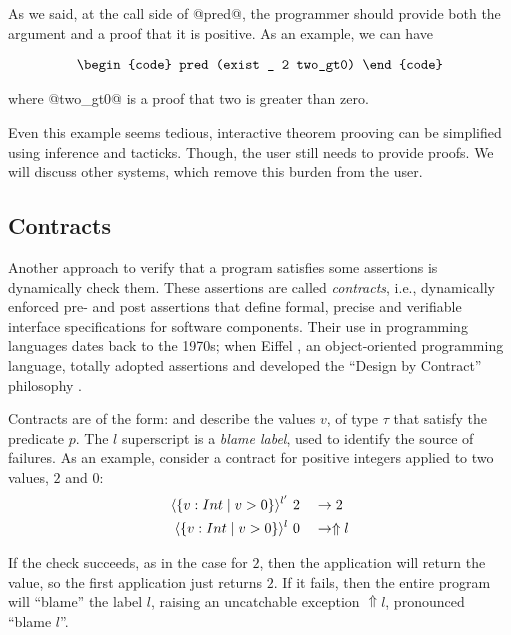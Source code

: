 As we said, at the call side of @pred@, the programmer should provide
both the argument and a proof that it is positive.
As an example, we can have 

$$\centering
\begin{tabular}{c}
\begin{code}
pred (exist _ 2 two_gt0)
\end{code}
\end{tabular}
$$
 
where @two_gt0@ is a proof that two is greater than zero.

\begin{comment}
Theorem two_gt0 : 2 > 0.
  crush.
Qed.
\end{comment}

Even this example seems tedious, 
interactive theorem prooving can be simplified
using inference and tacticks. 
%
Though, the user still needs to provide proofs.
%
We will discuss other systems, which remove this burden from the user.

\subsection{Contracts}


Another approach to verify that a program satisfies some 
assertions is dynamically check them.
% 
These assertions are called \textit{contracts}, i.e., 
dynamically enforced pre- and post assertions that
define formal, precise and verifiable interface specifications 
for software components.
%	
Their use in programming languages dates back to the 1970s; 
when Eiffel \cite{Eiffel}, an object-oriented programming language,
totally adopted assertions and developed the 
``Design by Contract'' philosophy \cite{Meyer92}.

Contracts are of the form:
and describe the values $v$, of type $\tau$
that satisfy the predicate $p$. 
The $l$ superscript is a \textit{blame label}, used to
identify the source of failures.
%
As an example, 
consider a contract for positive integers 
applied to two values, $2$ and $0$: 
\begin{align*}
\langle\{v : Int \mid v>0 \}\rangle^{l'}&\ 2 &&\rightarrow 2 \\
\langle\{v : Int \mid v>0 \}\rangle^{l}&\ 0  &&\rightarrow \Uparrow l
\end{align*}

If the check succeeds, as in the case for $2$,
then the application will return the value, so the first 
application just returns $2$.
If it fails, then the entire program will ``blame'' the label $l$,
raising an uncatchable exception  $\Uparrow l$, pronounced ``blame $l$''.

